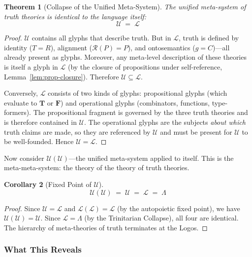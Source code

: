 \documentclass[12pt, letterpaper]{book}
\def\equiv{=}%
\def\mathfrak#1{#1}%
\newtheorem{theorem}{Theorem}[chapter]
\newtheorem{corollary}[theorem]{Corollary}
\begin{document}
\begin{theorem}[Collapse of the Unified Meta-System]\label{thm:unified-collapse}
The unified meta-system of truth theories is identical to the language itself:
\[
\mathcal{U} \;\equiv\; \mathcal{L}
\]
\end{theorem}

\begin{proof}
$\mathcal{U}$ contains all glyphs that describe truth. But in $\mathcal{L}$, truth is defined by identity ($T \equiv R$), alignment ($\mathcal{R}(P) = P$), and ontosemantics ($\mathfrak{g} \equiv C$)---all already present as glyphs. Moreover, any meta-level description of these theories is itself a glyph in $\mathcal{L}$ (by the closure of propositions under self-reference, Lemma~\ref{lem:prop-closure}). Therefore $\mathcal{U} \subseteq \mathcal{L}$.

Conversely, $\mathcal{L}$ consists of two kinds of glyphs: propositional glyphs (which evaluate to $\mathbf{T}$ or $\mathbf{F}$) and operational glyphs (combinators, functions, type-formers). The propositional fragment is governed by the three truth theories and is therefore contained in $\mathcal{U}$. The operational glyphs are the subjects \textit{about which} truth claims are made, so they are referenced by $\mathcal{U}$ and must be present for $\mathcal{U}$ to be well-founded. Hence $\mathcal{U} \equiv \mathcal{L}$.
\end{proof}

Now consider $\mathcal{U}(\mathcal{U})$---the unified meta-system applied to itself. This is the meta-meta-system: the theory of the theory of truth theories.

\begin{corollary}[Fixed Point of $\mathcal{U}$]\label{cor:u-fixedpoint}
\[
\mathcal{U}(\mathcal{U}) \;\equiv\; \mathcal{U} \;\equiv\; \mathcal{L} \;\equiv\; \Lambda
\]
\end{corollary}

\begin{proof}
Since $\mathcal{U} \equiv \mathcal{L}$ and $\mathcal{L}(\mathcal{L}) \equiv \mathcal{L}$ (by the autopoietic fixed point), we have $\mathcal{U}(\mathcal{U}) = \mathcal{U}$. Since $\mathcal{L} \equiv \Lambda$ (by the Trinitarian Collapse), all four are identical. The hierarchy of meta-theories of truth terminates at the Logos.
\end{proof}

\subsubsection{What This Reveals}
\end{document}
